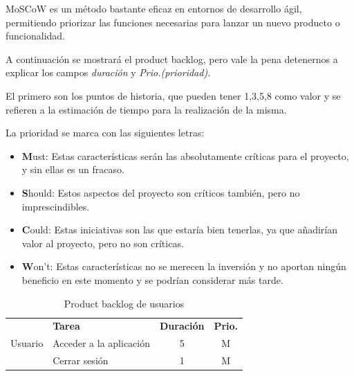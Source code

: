 MoSCoW es un método bastante eficaz en entornos de desarrollo ágil, permitiendo priorizar las funciones necesarias para lanzar un nuevo producto o funcionalidad.

A continuación se mostrará el product backlog, pero vale la pena detenernos a explicar los campos \textit{duración} y \textit{Prio.(prioridad)}.

El primero son los puntos de historia, que pueden tener 1,3,5,8 como valor y se refieren a la estimación de tiempo para la realización de la misma.

La prioridad se marca con las siguientes letras:
\begin{itemize}
	\item  \textbf{M}ust: Estas características serán las absolutamente críticas para el proyecto, y sin ellas es un fracaso.
	\item \textbf{S}hould: Estos aspectos del proyecto son críticos también, pero no imprescindibles.
	\item \textbf{C}ould: Estas iniciativas son las que estaría bien tenerlas, ya que añadirían valor al proyecto, pero no son críticas.
	\item \textbf{W}on't: Estas características no se merecen la inversión y no aportan ningún beneficio en este momento y se podrían considerar más tarde.
\end{itemize}

\begin{table}[H]
	\centering
	\begin{tabular}{|c |p{8cm}|c |c|} \hline 
		\multirow[c]{3}{*}{Usuario}&  \textbf{Tarea}&  \textbf{Duración}& \textbf{Prio.}\\  \cline{2-4}%
		&  Acceder a la aplicación&  5& M\\ \cline{2-4} 
		&  Cerrar sesión&  1& M\\ \hline 
	\end{tabular}
	\caption{Product backlog de usuarios}
	\label{tab:pb_usuarios}
\end{table}

